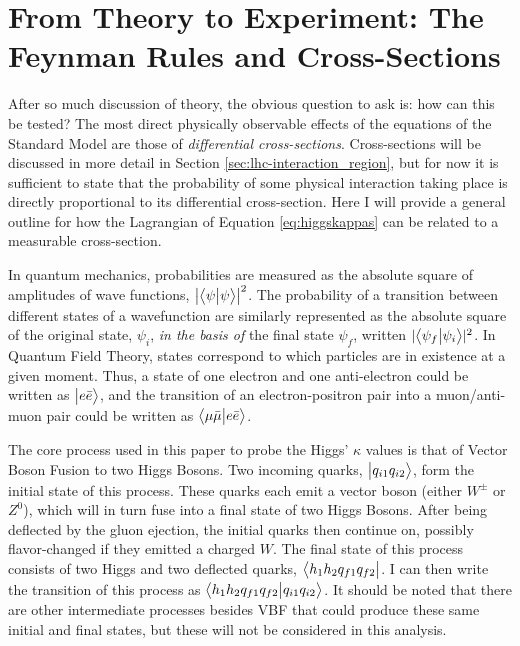 \section{From Theory to Experiment: The Feynman Rules and Cross-Sections}
    
    After so much discussion of theory, the obvious question to ask is: how can this be tested?
    The most direct physically observable effects of the equations of the Standard Model are those of \textit{differential cross-sections}.
    Cross-sections will be discussed in more detail in Section \ref{sec:lhc-interaction_region},
        but for now it is sufficient to state that the probability of some physical interaction taking place
        is directly proportional to its differential cross-section.
    Here I will provide a general outline for how the Lagrangian of Equation \ref{eq:higgskappas} can be related to a measurable cross-section.

    In quantum mechanics, probabilities are measured as the absolute square of amplitudes of wave functions, $\left|\big< \psi \big| \psi \big>\right|^2$.
    The probability of a transition between different states of a wavefunction are similarly represented
        as the absolute square of the original state, $\psi_i$, \textit{in the basis of} the final state $\psi_f$,
        written $ |\big< \psi_f \big| \psi_i \big>|^2$.
    In Quantum Field Theory, states correspond to which particles are in existence at a given moment.
    Thus, a state of one electron and one anti-electron could be written as $\big| e \bar{e} \big>$,
        and the transition of an electron-positron pair into a muon/anti-muon pair could be written
        as $\big< \mu \bar{\mu} \big| e \bar{e} \big>$.

    The core process used in this paper to probe the Higgs' $\kappa$ values is that of Vector Boson Fusion to two Higgs Bosons.
    Two incoming quarks, $\big| q_{i1} q_{i2} \big>$, form the initial state of this process.
    These quarks each emit a vector boson (either $W^{\pm}$ or $Z^0$), 
        which will in turn fuse into a final state of two Higgs Bosons.
    After being deflected by the gluon ejection, the initial quarks then continue on, possibly flavor-changed if they emitted a charged $W$.
    The final state of this process consists of two Higgs and two deflected quarks, $\big< h_1 h_2 q_{f1} q_{f2} \big|$.
    I can then write the transition of this process as $\big<  h_1 h_2 q_{f1} q_{f2} \big| q_{i1} q_{i2} \big>$.
    It should be noted that there are other intermediate processes besides VBF
        that could produce these same initial and final states, 
        but these will not be considered in this analysis.

